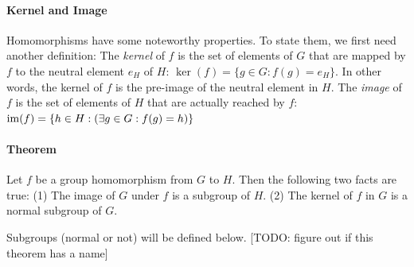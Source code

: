 



\paragraph{Kernel and Image} Homomorphisms have some noteworthy properties. To state them, we first need another definition: The \emph{kernel} of $f$ is the set of elements of $G$ that are mapped by $f$ to the neutral element $e_H$ of $H$: $\ker(f) = \{ g \in G: f(g) = e_H \}$. In other words, the kernel of $f$ is the pre-image of the neutral element in $H$. The \emph{image} of $f$ is the set of elements of $H$ that are actually reached by $f$: $\operatorname{im}(f) = \{ h \in H: (\exists g \in G: f(g) = h )\}$

\paragraph{Theorem} Let $f$ be a group homomorphism from $G$ to $H$. Then the following two facts are true: (1) The image of $G$ under $f$ is a subgroup of $H$. (2) The kernel of $f$ in $G$ is a normal subgroup of $G$.

\medskip Subgroups (normal or not) will be defined below.
[TODO: figure out if this theorem has a name]




